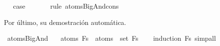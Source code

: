 \begin{isabellebody}
\ \isamarkupfalse%
\ {\isacharquery}case\ \isanewline
\ \ \ \ \isamarkupfalse%
\ {\isacharparenleft}rule\ atoms{\isacharunderscore}BigAnd{\isacharunderscore}cons{\isacharparenright}\isanewline
{}\isamarkupfalse%
%
\endisatagproof
{\isafoldproof}%
%
\isadelimproof
%
\endisadelimproof
%
\begin{isamarkuptext}%
Por último, su demostración automática.%
\end{isamarkuptext}\isamarkuptrue%
\isamarkupfalse%
\ atoms{\isacharunderscore}BigAnd{\isacharcolon}\ \isanewline
\ \ {\isachardoublequoteopen}atoms\ {\isacharparenleft}\isactrlbold {\isasymAnd}Fs{\isacharparenright}\ {\isacharequal}\ {\isasymUnion}{\isacharparenleft}atoms\ {\isacharbackquote}\ set\ Fs{\isacharparenright}{\isachardoublequoteclose}\isanewline
%
\isadelimproof
\ \ %
\endisadelimproof
%
\isatagproof
{}\isamarkupfalse%
\ {\isacharparenleft}induction\ Fs{\isacharparenright}\ simp{\isacharunderscore}all%
\endisatagproof
{\isafoldproof}%
%
\isadelimproof
%
\endisadelimproof
%
\isadelimtheory
%
\endisadelimtheory
%
\isatagtheory
%
\endisatagtheory
{\isafoldtheory}%
%
\isadelimtheory
%
\endisadelimtheory
%
\end{isabellebody}%
\endinput
